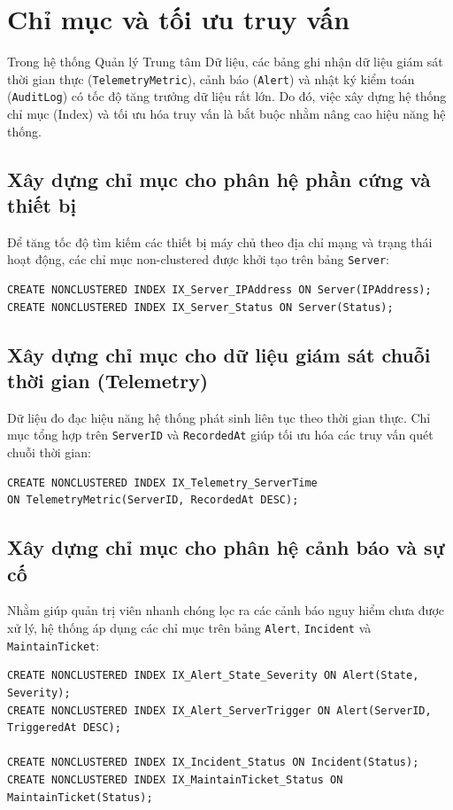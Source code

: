 \section{Chỉ mục và tối ưu truy vấn}

Trong hệ thống Quản lý Trung tâm Dữ liệu, các bảng ghi nhận dữ liệu giám sát thời gian thực (\texttt{TelemetryMetric}), cảnh báo (\texttt{Alert}) và nhật ký kiểm toán (\texttt{AuditLog}) có tốc độ tăng trưởng dữ liệu rất lớn. Do đó, việc xây dựng hệ thống chỉ mục (Index) và tối ưu hóa truy vấn là bắt buộc nhằm nâng cao hiệu năng hệ thống.

\subsection{Xây dựng chỉ mục cho phân hệ phần cứng và thiết bị}
Để tăng tốc độ tìm kiếm các thiết bị máy chủ theo địa chỉ mạng và trạng thái hoạt động, các chỉ mục non-clustered được khởi tạo trên bảng \texttt{Server}:

\begin{verbatim}
CREATE NONCLUSTERED INDEX IX_Server_IPAddress ON Server(IPAddress);
CREATE NONCLUSTERED INDEX IX_Server_Status ON Server(Status);
\end{verbatim}

\subsection{Xây dựng chỉ mục cho dữ liệu giám sát chuỗi thời gian (Telemetry)}
Dữ liệu đo đạc hiệu năng hệ thống phát sinh liên tục theo thời gian thực. Chỉ mục tổng hợp trên \texttt{ServerID} và \texttt{RecordedAt} giúp tối ưu hóa các truy vấn quét chuỗi thời gian:

\begin{verbatim}
CREATE NONCLUSTERED INDEX IX_Telemetry_ServerTime 
ON TelemetryMetric(ServerID, RecordedAt DESC);
\end{verbatim}

\subsection{Xây dựng chỉ mục cho phân hệ cảnh báo và sự cố}
Nhằm giúp quản trị viên nhanh chóng lọc ra các cảnh báo nguy hiểm chưa được xử lý, hệ thống áp dụng các chỉ mục trên bảng \texttt{Alert}, \texttt{Incident} và \texttt{MaintainTicket}:

\begin{verbatim}
CREATE NONCLUSTERED INDEX IX_Alert_State_Severity ON Alert(State, Severity);
CREATE NONCLUSTERED INDEX IX_Alert_ServerTrigger ON Alert(ServerID, TriggeredAt DESC);

CREATE NONCLUSTERED INDEX IX_Incident_Status ON Incident(Status);
CREATE NONCLUSTERED INDEX IX_MaintainTicket_Status ON MaintainTicket(Status);
\end{verbatim}

